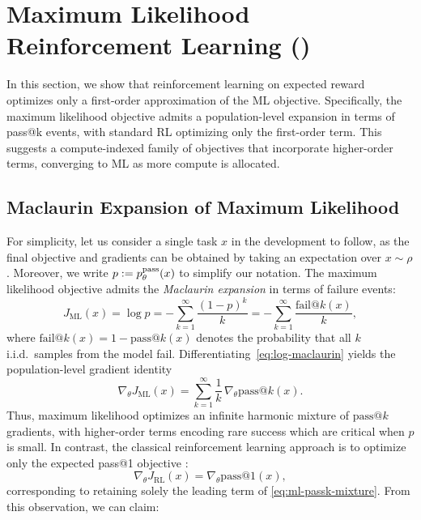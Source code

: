 \documentclass[10pt]{article} %
\begin{document}
\section{Maximum Likelihood Reinforcement Learning (\ours{})} \label{sec:methods}


In this section, we show that reinforcement learning on expected reward optimizes
only a first-order approximation of the ML objective. Specifically, the maximum likelihood objective admits a population-level expansion in terms of pass@k events, with standard RL optimizing only the first-order term. This suggests a compute-indexed family 
of objectives that incorporate higher-order terms, converging to ML as more 
compute is allocated.



\subsection{Maclaurin Expansion of Maximum Likelihood}
\label{sec:population_passk}
For simplicity, let us consider a single task $x$ in the development to follow, as the final objective and gradients can be obtained by taking an expectation over $x \sim \rho$. Moreover, we write $p := p^{\mathrm{pass}}_{\theta}(x)$ to simplify our notation. The maximum likelihood objective admits the \emph{Maclaurin  expansion} in terms of failure events:
\begin{equation}
J_{\mathrm{ML}}(x)
=
\log p
=
-\sum_{k=1}^{\infty}\frac{(1-p)^k}{k}
=
-\sum_{k=1}^{\infty}\frac{\mathrm{fail@}k(x)}{k},
\label{eq:log-maclaurin}
\end{equation}
where $\mathrm{fail@}k(x)=1-\mathrm{pass@}k(x)$ denotes the probability that all
$k$ i.i.d.\ samples from the model fail.
Differentiating~\eqref{eq:log-maclaurin} yields the population-level gradient
identity
\begin{equation}
\boxed{
\nabla_\theta J_{\mathrm{ML}}(x)
=
\sum_{k=1}^{\infty}\frac{1}{k}\,
\nabla_\theta \mathrm{pass@}k(x).
}
\label{eq:ml-passk-mixture}
\end{equation}
Thus, maximum likelihood optimizes an infinite harmonic mixture of $\mathrm{pass}@k$ gradients, with higher-order terms encoding rare success which are critical when $p$ is small. In contrast, the classical reinforcement learning approach is to optimize only the expected
pass@1 objective \citep{koenig1993complexity,silver2016mastering,vecerik2018leveragingdemonstrationsdeepreinforcement,guo2025deepseek}:
\[
\nabla_\theta J_{\mathrm{RL}}(x)
=
\nabla_\theta \mathrm{pass@}1(x),
\]
corresponding to retaining solely the leading term of
\eqref{eq:ml-passk-mixture}. From this observation, we can claim:
\end{document}
